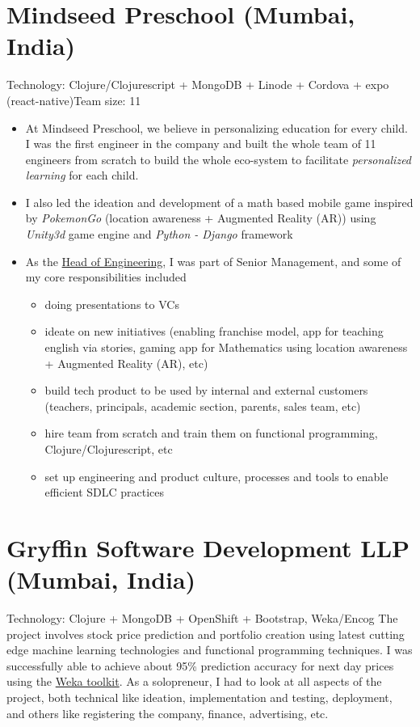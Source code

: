 \documentclass[11pt,a4paper,sans]{moderncv} %
\newcommand\Colorhref[3][blue]{\href{#2}{\small\color{#1}#3}}
\begin{document}
\section{Mindseed Preschool (Mumbai, India)}
         {Technology: Clojure/Clojurescript + MongoDB + Linode + Cordova + expo (react-native)}{Team size: 11}
         {\begin{itemize}
             \item At Mindseed Preschool, we believe in personalizing education for every child. I was the first engineer in the company and built the whole team of 11 engineers from scratch to build the whole eco-system to facilitate \textit{personalized learning} for each child.
             \item I also led the ideation and development of a math based mobile game inspired by \textit{PokemonGo} (location awareness + Augmented Reality (AR)) using \textit{Unity3d} game engine and \textit{Python - Django} framework
             \item As the \Colorhref{http://mindseed.in/about-us/our-team/}{Head of Engineering}, I was part of Senior Management, and some of my core responsibilities included
            \begin{itemize}
              \item doing presentations to VCs
              \item ideate on new initiatives (enabling franchise model, app for teaching english via stories, gaming app for Mathematics using location awareness + Augmented Reality (AR), etc)
              \item build tech product to be used by internal and external customers (teachers, principals, academic section, parents, sales team, etc)
              \item hire team from scratch and train them on functional programming, Clojure/Clojurescript, etc
              \item set up engineering and product culture, processes and tools to enable efficient SDLC practices
            \end{itemize}
         \end{itemize}}

\section{Gryffin Software Development LLP (Mumbai, India)}
         {}{Technology: Clojure + MongoDB + OpenShift + Bootstrap, Weka/Encog}
         {The project involves stock price prediction and portfolio creation using latest cutting edge machine learning technologies and functional programming techniques. I was successfully able to achieve about 95\% prediction accuracy for next day prices using the \Colorhref{https://weka.8497.n7.nabble.com/how-to-use-non-target-attributes-for-timeseries-prediction-in-weka-td35191.html}{Weka toolkit}. As a solopreneur, I had to look at all aspects of the project, both technical like ideation, implementation and testing, deployment, and others like registering the company, finance, advertising, etc.}
\end{document}
